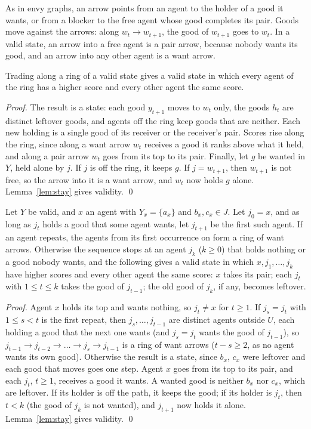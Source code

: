 \documentclass[runningheads,11pt]{llncs}
\begin{document}
\noindent As in envy graphs, an arrow points from an agent to the holder of a good it wants, or from a blocker to the free agent whose good completes its pair. Goods move against the arrows: along $w_t\to w_{t+1}$, the good of $w_{t+1}$ goes to $w_t$. In a valid state, an arrow into a free agent is a pair arrow, because nobody wants its good, and an arrow into any other agent is a want arrow.

\begin{lemma}[ring]\label{lem:ring}
Trading along a ring of a valid state gives a valid state in which every agent of the ring has a higher score and every other agent the same score.
\end{lemma}

\begin{proof}
The result is a state: each good $y_{t+1}$ moves to $w_t$ only, the goods $h_t$ are distinct leftover goods, and agents off the ring keep goods that are neither. Each new holding is a single good of its receiver or the receiver's pair. Scores rise along the ring, since along a want arrow $w_t$ receives a good it ranks above what it held, and along a pair arrow $w_t$ goes from its top to its pair. Finally, let $g$ be wanted in $Y$, held alone by $j$. If $j$ is off the ring, it keeps $g$. If $j=w_{t+1}$, then $w_{t+1}$ is not free, so the arrow into it is a want arrow, and $w_t$ now holds $g$ alone. Lemma~\ref{lem:stay} gives validity. \qed
\end{proof}

\begin{lemma}[chain]\label{lem:chain}
Let $Y$ be valid, and $x$ an agent with $Y_x=\{a_x\}$ and $b_x,c_x\in J$. Let $j_0=x$, and as long as $j_t$ holds a good that some agent wants, let $j_{t+1}$ be the first such agent. If an agent repeats, the agents from its first occurrence on form a ring of want arrows. Otherwise the sequence stops at an agent $j_k$ ($k\ge0$) that holds nothing or a good nobody wants, and the following gives a valid state in which $x,j_1,\dots,j_k$ have higher scores and every other agent the same score: $x$ takes its pair; each $j_t$ with $1\le t\le k$ takes the good of $j_{t-1}$; the old good of $j_k$, if any, becomes leftover.
\end{lemma}

\begin{proof}
Agent $x$ holds its top and wants nothing, so $j_t\ne x$ for $t\ge1$. If $j_s=j_t$ with $1\le s<t$ is the first repeat, then $j_s,\dots,j_{t-1}$ are distinct agents outside $U$, each holding a good that the next one wants (and $j_s=j_t$ wants the good of $j_{t-1}$), so $j_{t-1}\to j_{t-2}\to\dots\to j_s\to j_{t-1}$ is a ring of want arrows ($t-s\ge2$, as no agent wants its own good). Otherwise the result is a state, since $b_x$, $c_x$ were leftover and each good that moves goes one step. Agent $x$ goes from its top to its pair, and each $j_t$, $t\ge1$, receives a good it wants. A wanted good is neither $b_x$ nor $c_x$, which are leftover. If its holder is off the path, it keeps the good; if its holder is $j_t$, then $t<k$ (the good of $j_k$ is not wanted), and $j_{t+1}$ now holds it alone. Lemma~\ref{lem:stay} gives validity. \qed
\end{proof}
\end{document}
